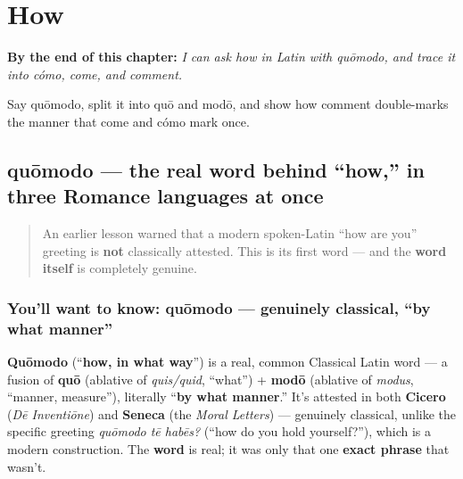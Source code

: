 
\chapter{How}
\label{ch:la-how}

\begin{chapteropening}
\textbf{By the end of this chapter:} \emph{I can ask how in Latin with quōmodo, and trace it into cómo, come, and comment.}

Say quōmodo, split it into quō and modō, and show how comment double-marks the manner that come and cómo mark once.
\end{chapteropening}

\section[quōmodo]{quōmodo — the real word behind \textquotedblleft{}how,\textquotedblright{} in three Romance languages at once}

\label{lesson:LA-C26-quomodo}



\begin{quote}
An earlier lesson warned that a modern spoken-Latin \textquotedblleft{}how are you\textquotedblright{} greeting is \textbf{not} classically attested. This is its first word — and the \textbf{word itself} is completely genuine.
\end{quote}

\subsection*{You'll want to know: quōmodo — genuinely classical, \textquotedblleft{}by what manner\textquotedblright{}}
\textbf{Quōmodo} (\textquotedblleft{}\textbf{how, in what way}\textquotedblright{}) is a real, common Classical Latin word — a fusion of \textbf{quō} (ablative of \emph{quis/quid}, \textquotedblleft{}what\textquotedblright{}) + \textbf{modō} (ablative of \emph{modus}, \textquotedblleft{}manner, measure\textquotedblright{}), literally \textquotedblleft{}\textbf{by what manner}.\textquotedblright{} It's attested in both \textbf{Cicero} (\emph{Dē Inventiōne}) and \textbf{Seneca} (the \emph{Moral Letters}) — genuinely classical, unlike the specific greeting \emph{quōmodo tē habēs?} (\textquotedblleft{}how do you hold yourself?\textquotedblright{}), which is a modern construction. The \textbf{word} is real; it was only that one \textbf{exact phrase} that wasn't.

